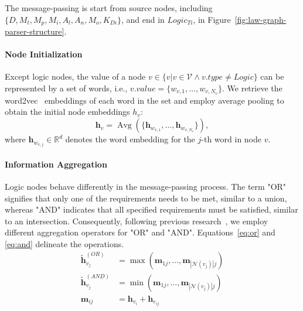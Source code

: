 
The message-passing is start from source nodes, including $\{D, M_t, M_p, M_i, A_l, A_n, M_o, K_{Di}\}$, and end in $Logic_{Ti}$, in Figure~\ref{fig:law-graph-parser-structure}. %

\paragraph{Node Initialization} Except logic nodes, the value of a node $v\in \{v|v\in \mathcal{V} \land v.type\neq Logic\}$ can be represented by a set of words, i.e., $v.value=\{w_{v,1},\ldots,w_{v, N_{v}}\}$. We retrieve the word2vec~\cite{10.1145/3375395.3387641} embeddings of each word in the set and employ average pooling to obtain the initial node embeddings $h_{v}$: 
\begin{equation}
    \mathbf{h}_{v} = \operatorname{Avg}(\{\mathbf{h}_{w_{v,1}},\ldots,\mathbf{h}_{w_{v,N_{v}}}\}),
    \label{eq:node}
\end{equation}
where $\mathbf{h}_{w_{v,j}} \in \mathbb{R}^{d}$ denotes the word embedding for the $j$-th word in node $v$.

\paragraph{Information Aggregation} Logic nodes behave differently in the message-passing process. The term "OR" signifies that only one of the requirements needs to be met, similar to a union, whereas "AND" indicates that all specified requirements must be satisfied, similar to an intersection. Consequently, following previous research~\cite{huang2022line}, we employ different aggregation operators for "OR" and "AND". Equations~\ref{eq:or} and \ref{eq:and} delineate the operations.
\begin{align}
\tilde{\mathbf{h}}_{v_j}^{(OR)} &= \max(\mathbf{m}_{1j},\ldots,\mathbf{m}_{|\mathcal{N}(v_j)|j}) \label{eq:or} \\
\tilde{\mathbf{h}}_{v_j}^{(AND)} &= \min(\mathbf{m}_{1j},\ldots,\mathbf{m}_{|\mathcal{N}(v_j)|j}) \label{eq:and} \\
\mathbf{m}_{ij} &= \mathbf{h}_{v_i} + \mathbf{h}_{e_{ij}}
\end{align}

